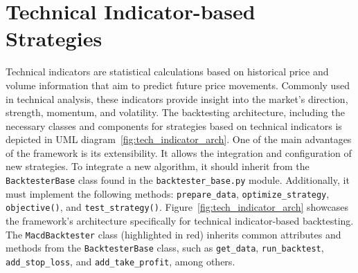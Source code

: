 \section{Technical Indicator-based Strategies}
Technical indicators are statistical calculations based on historical price and volume information that aim to predict future price movements.
Commonly used in technical analysis, these indicators provide insight into the market's direction, strength, momentum, and volatility.
The backtesting architecture, including the necessary classes and components for strategies based on technical indicators is depicted in UML diagram~\ref{fig:tech_indicator_arch}.
One of the main advantages of the framework is its extensibility. It allows the integration and configuration of new strategies.
To integrate a new algorithm, it should inherit from the \texttt{BacktesterBase} class found in the \texttt{backtester\_base.py} module. Additionally, it must implement the following methods: \texttt{prepare\_data}, \texttt{optimize\_strategy}, \texttt{objective()}, and \texttt{test\_strategy()}.
Figure~\ref{fig:tech_indicator_arch} showcases the framework's architecture specifically for technical indicator-based backtesting.
The \texttt{MacdBacktester} class (highlighted in red) inherits common attributes and methods from the \texttt{BacktesterBase} class,
such as \texttt{get\_data}, \texttt{run\_backtest}, \texttt{add\_stop\_loss}, and \texttt{add\_take\_profit}, among others.

